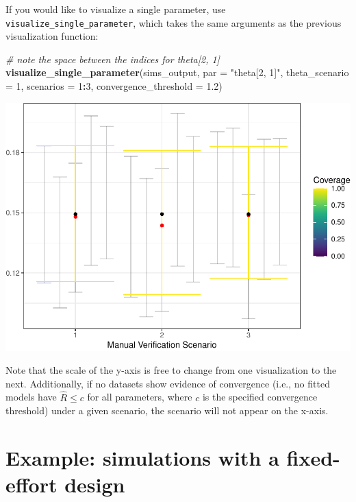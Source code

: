 \documentclass[
]{article}
\newenvironment{Shaded}{\begin{snugshade}}{\end{snugshade}}
\newcommand{\AttributeTok}[1]{\textcolor[rgb]{0.13,0.29,0.53}{#1}}
\newcommand{\CommentTok}[1]{\textcolor[rgb]{0.56,0.35,0.01}{\textit{#1}}}
\newcommand{\DecValTok}[1]{\textcolor[rgb]{0.00,0.00,0.81}{#1}}
\newcommand{\FloatTok}[1]{\textcolor[rgb]{0.00,0.00,0.81}{#1}}
\newcommand{\FunctionTok}[1]{\textcolor[rgb]{0.13,0.29,0.53}{\textbf{#1}}}
\newcommand{\NormalTok}[1]{#1}
\newcommand{\SpecialCharTok}[1]{\textcolor[rgb]{0.81,0.36,0.00}{\textbf{#1}}}
\newcommand{\StringTok}[1]{\textcolor[rgb]{0.31,0.60,0.02}{#1}}
\begin{document}
If you would like to visualize a single parameter, use \texttt{visualize\_single\_parameter}, which takes the same arguments as the previous visualization function:

\linespread{1}

\begin{Shaded}
\begin{Highlighting}[]
\CommentTok{\# note the space between the indices for theta[2, 1]}
\FunctionTok{visualize\_single\_parameter}\NormalTok{(sims\_output, }\AttributeTok{par =} \StringTok{"theta[2, 1]"}\NormalTok{, }
                           \AttributeTok{theta\_scenario =} \DecValTok{1}\NormalTok{, }
                           \AttributeTok{scenarios =} \DecValTok{1}\SpecialCharTok{:}\DecValTok{3}\NormalTok{, }
                           \AttributeTok{convergence\_threshold =} \FloatTok{1.2}\NormalTok{)}
\end{Highlighting}
\end{Shaded}

\includegraphics{Vignette_files/figure-latex/unnamed-chunk-20-1.pdf}

\linespread{1}

Note that the scale of the y-axis is free to change from one visualization to the next. Additionally, if no datasets show evidence of convergence (i.e., no fitted models have \(\hat{R} \leq c\) for all parameters, where \(c\) is the specified convergence threshold) under a given scenario, the scenario will not appear on the x-axis.

\hypertarget{FEexample}{%
\section{Example: simulations with a fixed-effort design}\label{FEexample}}
\end{document}
